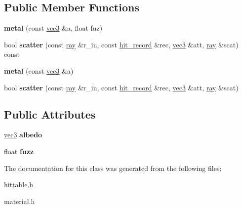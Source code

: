 \subsection*{Public Member Functions}
\begin{DoxyCompactItemize}
\item 
\mbox{\label{classmetal_a7624f5dc09c2c990ff870eac0aed8ebf}} 
{\bfseries metal} (const \hyperlink{classvec3}{vec3} \&a, float fuz)
\item 
\mbox{\label{classmetal_a894ce1be986fbe57fa211bc34cf93384}} 
bool {\bfseries scatter} (const \hyperlink{classray}{ray} \&r\+\_\+in, const \hyperlink{structhit__record}{hit\+\_\+record} \&rec, \hyperlink{classvec3}{vec3} \&att, \hyperlink{classray}{ray} \&scat) const
\item 
\mbox{\label{classmetal_afabfe136a55e444d6fe4f85718691b42}} 
{\bfseries metal} (const \hyperlink{classvec3}{vec3} \&a)
\item 
\mbox{\label{classmetal_ac5fe2b3f2868c5e7a7a118a5efc31be0}} 
bool {\bfseries scatter} (const \hyperlink{classray}{ray} \&r\+\_\+in, const \hyperlink{structhit__record}{hit\+\_\+record} \&rec, \hyperlink{classvec3}{vec3} \&att, \hyperlink{classray}{ray} \&scat)
\end{DoxyCompactItemize}
\subsection*{Public Attributes}
\begin{DoxyCompactItemize}
\item 
\mbox{\label{classmetal_a7c16624a6f180f58c3bda5558c71e7c1}} 
\hyperlink{classvec3}{vec3} {\bfseries albedo}
\item 
\mbox{\label{classmetal_a7b1a155f70bf086fc84c4c17d1e6f88c}} 
float {\bfseries fuzz}
\end{DoxyCompactItemize}


The documentation for this class was generated from the following files\+:\begin{DoxyCompactItemize}
\item 
hittable.\+h\item 
material.\+h\end{DoxyCompactItemize}
